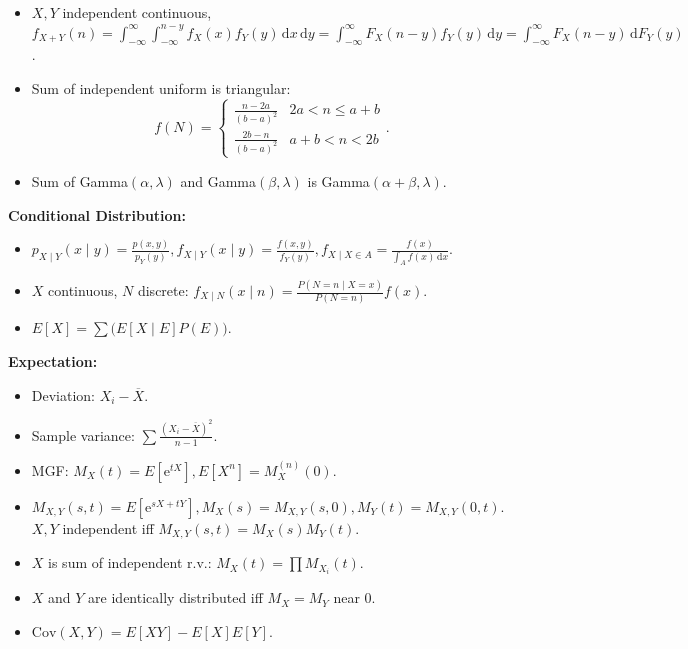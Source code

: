\documentclass[9pt]{article}
\begin{document}
\begin{multicols*}{2}
\begin{itemize}
            \item $X, Y$ independent continuous, $f_{X + Y}(n) = \int_{-\infty}^{\infty}\int_{-\infty}^{n - y}\!f_X(x)f_Y(y)\,\mathrm{d}x\,\mathrm{d}y = \int_{-\infty}^{\infty}\!F_X(n - y)f_Y(y)\,\mathrm{d}y = \int_{-\infty}^{\infty}\!F_X(n - y)\,\mathrm{d}F_Y(y)$.
            \item Sum of independent uniform is triangular:
            \begin{equation*}
                f(N) = \begin{cases}
                    \frac{n - 2a}{(b - a)^2} & 2a < n \leq a + b \\
                    \frac{2b - n}{(b - a)^2} & a + b < n < 2b
                \end{cases}.
            \end{equation*}
            \item Sum of Gamma$(\alpha, \lambda)$ and Gamma$(\beta, \lambda)$ is Gamma$(\alpha + \beta, \lambda)$.
        \end{itemize}
        \textbf{Conditional Distribution:}
        \begin{itemize}
            \item $p_{X \mid Y}(x \mid y) = \frac{p(x, y)}{p_Y(y)}, f_{X \mid Y}(x \mid y) = \frac{f(x, y)}{f_Y(y)}, f_{X \mid X \in A} = \frac{f(x)}{\int_{A}\!f(x)\,\mathrm{d}x}$.
            \item $X$ continuous, $N$ discrete: $f_{X \mid N}(x \mid n) = \frac{P(N = n \mid X = x)}{P(N = n)}f(x)$.
            \item $E[X] = \sum \bigl(E[X \mid E]P(E)\bigr)$.
        \end{itemize}
        \textbf{Expectation:}
        \begin{itemize}
            \item Deviation: $X_i - \overline{X}$.
            \item Sample variance: $\sum \frac{(X_i - \overline{X})^2}{n - 1}$.
            \item MGF: $M_X(t) = E[\mathrm{e}^{tX}], E[X^n] = M_X^{(n)}(0)$.
            \item $M_{X, Y}(s, t) = E[\mathrm{e}^{sX + tY}], M_X(s) = M_{X, Y}(s, 0), M_Y(t) = M_{X, Y}(0, t)$. $X, Y$ independent iff $M_{X, Y}(s, t) = M_X(s)M_Y(t)$.
            \item $X$ is sum of independent r.v.: $M_X(t) = \prod M_{X_i}(t)$.
            \item $X$ and $Y$ are identically distributed iff $M_X = M_Y$ near $0$.
            \item $\mathrm{Cov}(X, Y) = E[XY] - E[X]E[Y]$.

\end{itemize}
\end{multicols*}
\end{document}

